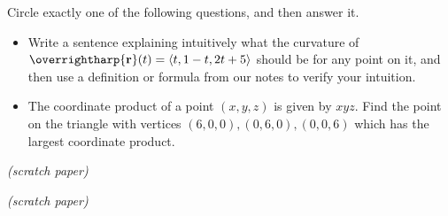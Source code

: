 \documentclass[12pt]{exam}
\newcommand{\harpvec}[1]{\overrightharp{\ensuremath{\mathbf{#1}}}}
\newcommand{\vect}[1]{\harpvec{#1}}
\newcommand{\<}{\langle}
\renewcommand{\>}{\rangle}
\begin{document}
\begin{questions}
\newpage


\question[10]
  Circle exactly one of the following questions, and then answer it.
  \begin{itemize}
    \item Write a sentence explaining intuitively what the curvature of
    \(\vect{r}(t)=\<t,1-t,2t+5\>\) should be for any point
    on it, and then use a definition or formula
    from our notes to verify your intuition.

    \item The coordinate product of a point \((x,y,z)\) is given by \(xyz\).
    Find the point on the triangle with vertices
    \((6,0,0),(0,6,0),(0,0,6)\) which has the largest coordinate product.
  \end{itemize}

\newpage

\textit{(scratch paper)}

\newpage

\textit{(scratch paper)}

\end{questions}
\end{document}
